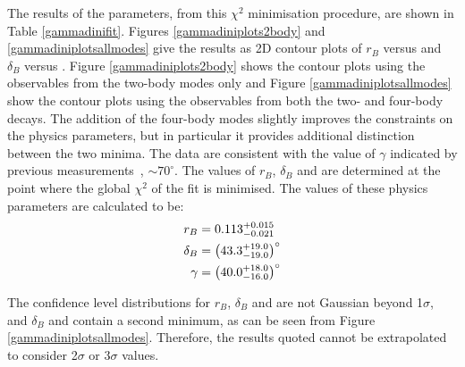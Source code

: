 The results of the parameters, from this $\chi^2$ minimisation procedure, are shown in Table \ref{gammadinifit}. Figures \ref{gammadiniplots2body} and \ref{gammadiniplotsallmodes} give the results as 2D contour plots of $r_B$ versus \Pgamma and $\delta_B$ versus \Pgamma. Figure \ref{gammadiniplots2body} shows the contour plots using the \CP observables from the two-body modes only and Figure \ref{gammadiniplotsallmodes} show the contour plots using the \CP observables from both the two- and four-body decays. The addition of the four-body modes slightly improves the constraints on the physics parameters, but in particular it provides additional distinction between the two minima. The data are consistent with the value of $\gamma$ indicated by previous measurements~\cite{LHCb-PAPER-2016-032, CKMFitter}, $\sim 70^\circ$. The values of $r_B$, $\delta_B$ and \Pgamma are determined at the point where the global $\chi^2$ of the fit is minimised. The values of these physics parameters are calculated to be:
\begin{align*}
r_B &= 0.113^{+0.015}_{-0.021} \\
\delta_B &= \left(43.3^{+19.0}_{-19.0}\right)^{\circ} \\
\gamma &= \left(40.0^{+18.0}_{-16.0}\right)^{\circ} 
\end{align*}

The confidence level distributions for $r_B$, $\delta_B$ and \Pgamma are not Gaussian beyond 1$\sigma$, and $\delta_B$ and \Pgamma contain a second minimum, as can be seen from Figure \ref{gammadiniplotsallmodes}. Therefore, the results quoted cannot be extrapolated to consider 2$\sigma$ or 3$\sigma$ values. 

